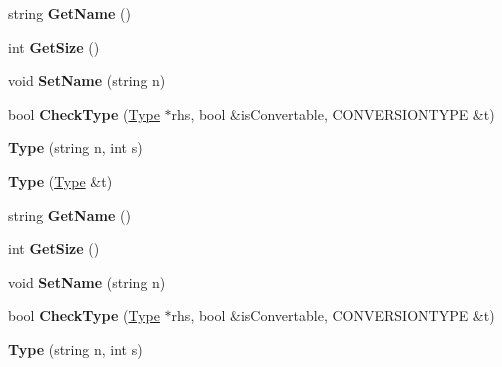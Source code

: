 \begin{DoxyCompactItemize}
\item 
\hypertarget{classType_a8143fe4686ae1a5709a5955396c6ee26}{string {\bfseries Get\-Name} ()}\label{classType_a8143fe4686ae1a5709a5955396c6ee26}

\item 
\hypertarget{classType_afe0fca035825759785b525d2a24f69fe}{int {\bfseries Get\-Size} ()}\label{classType_afe0fca035825759785b525d2a24f69fe}

\item 
\hypertarget{classType_ab8d2328a3a76289edf42b9bf0d4f278f}{void {\bfseries Set\-Name} (string n)}\label{classType_ab8d2328a3a76289edf42b9bf0d4f278f}

\item 
\hypertarget{classType_a2574b17ddc03d5ca13309811d06f1a56}{bool {\bfseries Check\-Type} (\hyperlink{classType}{Type} $\ast$rhs, bool \&is\-Convertable, C\-O\-N\-V\-E\-R\-S\-I\-O\-N\-T\-Y\-P\-E \&t)}\label{classType_a2574b17ddc03d5ca13309811d06f1a56}

\item 
\hypertarget{classType_a0ec88e19865012d53e20b97677218783}{{\bfseries Type} (string n, int s)}\label{classType_a0ec88e19865012d53e20b97677218783}

\item 
\hypertarget{classType_a617481e51492ea14507c83d5dba2cce5}{{\bfseries Type} (\hyperlink{classType}{Type} \&t)}\label{classType_a617481e51492ea14507c83d5dba2cce5}

\item 
\hypertarget{classType_a8143fe4686ae1a5709a5955396c6ee26}{string {\bfseries Get\-Name} ()}\label{classType_a8143fe4686ae1a5709a5955396c6ee26}

\item 
\hypertarget{classType_afe0fca035825759785b525d2a24f69fe}{int {\bfseries Get\-Size} ()}\label{classType_afe0fca035825759785b525d2a24f69fe}

\item 
\hypertarget{classType_ab8d2328a3a76289edf42b9bf0d4f278f}{void {\bfseries Set\-Name} (string n)}\label{classType_ab8d2328a3a76289edf42b9bf0d4f278f}

\item 
\hypertarget{classType_a2574b17ddc03d5ca13309811d06f1a56}{bool {\bfseries Check\-Type} (\hyperlink{classType}{Type} $\ast$rhs, bool \&is\-Convertable, C\-O\-N\-V\-E\-R\-S\-I\-O\-N\-T\-Y\-P\-E \&t)}\label{classType_a2574b17ddc03d5ca13309811d06f1a56}

\item 
\hypertarget{classType_a0ec88e19865012d53e20b97677218783}{{\bfseries Type} (string n, int s)}\label{classType_a0ec88e19865012d53e20b97677218783}


\end{DoxyCompactItemize}
